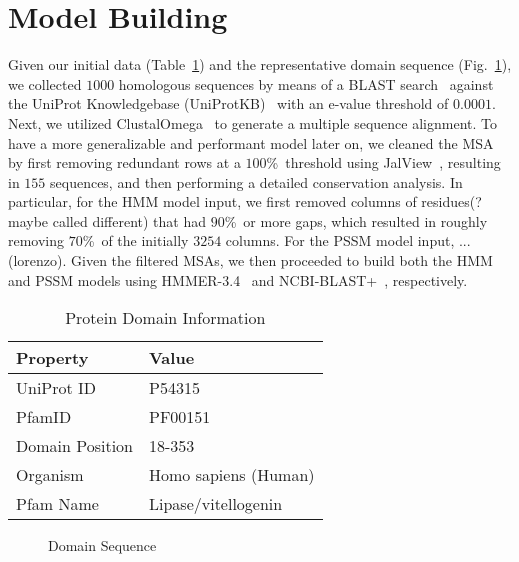 
\section{Model Building}

Given our initial data (Table~\ref{tab:protein_info}) and the representative domain sequence (Fig.~\ref{fig:sequence}), we collected $1000$ homologous sequences by means of a BLAST search~\cite{blast} against the UniProt Knowledgebase (UniProtKB)~\cite{uniprot} with an e-value threshold of $0.0001$. Next, we utilized ClustalOmega~\cite{clustalomega} to generate a multiple sequence alignment. To have a more generalizable and performant model later on, we cleaned the MSA by first removing redundant rows at a $100$\%\ threshold using JalView~\cite{jalview}, resulting in $155$ sequences, and then performing a detailed conservation analysis. In particular, for the HMM model input, we first removed columns of residues(? maybe called different) that had $90$\%\ or more gaps, which resulted in roughly removing $70$\%\ of the initially $3254$ columns. For the PSSM model input, ... (lorenzo). Given the filtered MSAs, we then proceeded to build both the HMM~\cite{hmmer} and PSSM models using HMMER-3.4~\cite{hmmer} and NCBI-BLAST+~\cite{ncbi-blast}, respectively.

\begin{table}[h]
    \centering
    \caption{Protein Domain Information}
    \label{tab:protein_info}
    \begin{tabular}{ll}
        \toprule
        \textbf{Property} & \textbf{Value} \\
        \midrule
        UniProt ID & P54315 \\
        PfamID & PF00151 \\
        Domain Position & 18-353 \\
        Organism & Homo sapiens (Human) \\
        Pfam Name & Lipase/vitellogenin \\
        \bottomrule
    \end{tabular}
\end{table}

\begin{figure}[h]
    \centering
    \caption{Domain Sequence}
    \label{fig:sequence}
    \footnotesize
\end{figure}